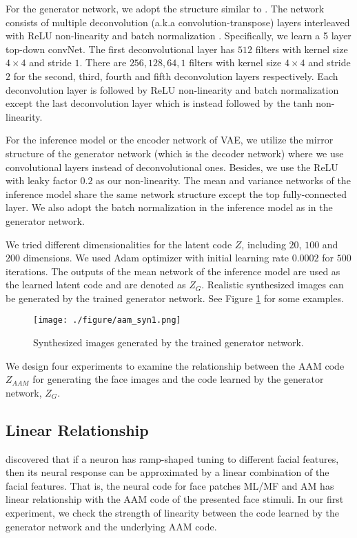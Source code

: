 \documentclass{article}
\begin{document}
For the generator network, we adopt the structure similar to \cite{radford2015unsupervised,Alexey2015}. The network consists of multiple deconvolution (a.k.a convolution-transpose) layers interleaved with ReLU non-linearity and batch normalization \cite{Ioffe2015BatchNA}. Specifically, we learn a 5 layer top-down convNet. The first deconvolutional layer has $512$ filters with kernel size $4\times4$ and stride  $1$. There are $256, 128, 64, 1$ filters with kernel size $4\times4$ and stride $2$ for the second, third, fourth and fifth deconvolution layers respectively. Each deconvolution layer is followed by ReLU non-linearity and batch normalization except the last deconvolution layer which is instead followed by the tanh non-linearity. 

For the inference model or the encoder network of VAE, we utilize the mirror structure of the generator network (which is the decoder network) where we use convolutional layers instead of deconvolutional ones. Besides, we use the ReLU with leaky factor $0.2$ as our non-linearity. The mean and variance networks of the inference model share the same network structure except the top fully-connected layer. We also adopt the batch normalization in the inference model as in the generator network. 

We tried different dimensionalities for the latent code $Z$, including $20$, $100$ and $200$ dimensions. We used Adam optimizer \cite{kingma2014adam} with initial learning rate $0.0002$ for $500$ iterations. The outputs of the mean network of the inference model are used as the learned latent code and are denoted as $Z_{G}$.  Realistic synthesized images can be generated by the trained generator network.  See Figure \ref{fig:VAE_syn} for some examples. 

\begin{figure}[h]
	\begin{center}
		\texttt{[image: ./figure/aam\_syn1.png]} %
		\caption{Synthesized images generated by the trained generator network.}
		\label{fig:VAE_syn}
	\end{center}	
\end{figure}


We design four experiments to examine the relationship between the AAM code $Z_{AAM}$ for generating the face images and the code learned by the generator network, $Z_{G}$. 

\subsection{Linear Relationship}
 \cite{chang2017code} discovered that  if a neuron has ramp-shaped tuning to different facial features, then its neural response can be approximated by a linear combination of the facial features. That is, the neural code for face patches ML/MF and AM has linear relationship with the AAM code of the presented face stimuli. In our first experiment, we check the strength of linearity between the code learned by the generator network and the underlying AAM code. 
\end{document}

